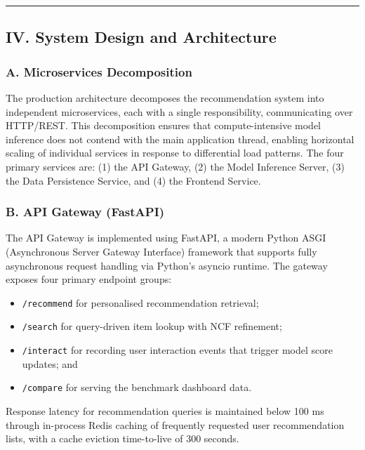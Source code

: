 \documentclass[
]{IEEEtran}
\providecommand{\tightlist}{%
  \setlength{\itemsep}{0pt}\setlength{\parskip}{0pt}}
\begin{document}
\begin{center}\rule{0.5\linewidth}{0.5pt}\end{center}

\subsection{IV. System Design and
Architecture}\label{iv.-system-design-and-architecture}

\subsubsection{A. Microservices
Decomposition}\label{a.-microservices-decomposition}

The production architecture decomposes the recommendation system into
independent microservices, each with a single responsibility,
communicating over HTTP/REST. This decomposition ensures that
compute-intensive model inference does not contend with the main
application thread, enabling horizontal scaling of individual services
in response to differential load patterns. The four primary services
are: (1) the API Gateway, (2) the Model Inference Server, (3) the Data
Persistence Service, and (4) the Frontend Service.

\subsubsection{B. API Gateway (FastAPI)}\label{b.-api-gateway-fastapi}

The API Gateway is implemented using FastAPI, a modern Python ASGI
(Asynchronous Server Gateway Interface) framework that supports fully
asynchronous request handling via Python's asyncio runtime. The gateway
exposes four primary endpoint groups:

\begin{itemize}
\tightlist
\item
  \texttt{/recommend} for personalised recommendation retrieval;
\item
  \texttt{/search} for query-driven item lookup with NCF refinement;
\item
  \texttt{/interact} for recording user interaction events that trigger
  model score updates; and
\item
  \texttt{/compare} for serving the benchmark dashboard data.
\end{itemize}

Response latency for recommendation queries is maintained below 100 ms
through in-process Redis caching of frequently requested user
recommendation lists, with a cache eviction time-to-live of 300 seconds.
\end{document}
